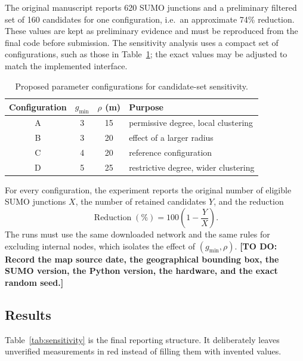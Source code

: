 \documentclass[engproc,proceedingpaper,submit,oneauthor]{Definitions/mdpi}
\newcommand{\todo}[1]{{\color{todored}\textbf{[TO DO: #1]}}}
\begin{document}
	The original manuscript reports 620 SUMO junctions and a preliminary filtered set of
	160 candidates for one configuration, i.e.\ an approximate 74\% reduction. These
	values are kept as preliminary evidence and must be reproduced from the final code
	before submission. The sensitivity analysis uses a compact set of configurations,
	such as those in Table~\ref{tab:configs}; the exact values may be adjusted to match
	the implemented interface.
	
	\begin{table}[H]
		\centering
		\caption{Proposed parameter configurations for candidate-set sensitivity.}
		\label{tab:configs}
		\begin{tabular}{cccl}
			\toprule
			Configuration & $g_{\min}$ & $\rho$ (m) & Purpose\\
			\midrule
			A & 3 & 15 & permissive degree, local clustering\\
			B & 3 & 20 & effect of a larger radius\\
			C & 4 & 20 & reference configuration\\
			D & 5 & 25 & restrictive degree, wider clustering\\
			\bottomrule
		\end{tabular}
	\end{table}
	
	For every configuration, the experiment reports the original number of eligible SUMO
	junctions $X$, the number of retained candidates $Y$, and the reduction
	\[
	\operatorname{Reduction}(\%)=100\left(1-\frac{Y}{X}\right).
	\]
	The runs must use the same downloaded network and the same rules for excluding
	internal nodes, which isolates the effect of $(g_{\min},\rho)$. \todo{Record the map
		source date, the geographical bounding box, the SUMO version, the Python version, the
		hardware, and the exact random seed.}
	
	\subsection{Results}
	Table~\ref{tab:sensitivity} is the final reporting structure. It deliberately leaves
	unverified measurements in red instead of filling them with invented values.
	
\end{document}

